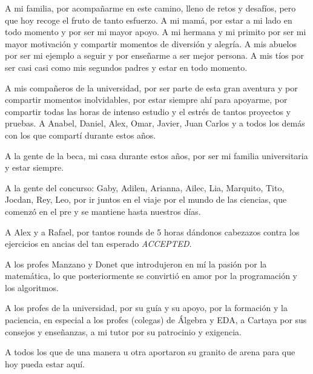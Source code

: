 \begin{acknowledgements}
    A mi familia, por acompañarme en este camino, lleno de retos y desafíos, pero que hoy recoge el fruto de tanto esfuerzo.
    A mi mamá, por estar a mi lado en todo momento y por ser mi mayor apoyo. A mi hermana y mi primito por ser mi mayor motivación y compartir
    momentos de diversión y alegría. A mis abuelos por ser mi ejemplo a seguir y por enseñarme a ser mejor persona.
    A mis tíos por ser casi casi como mis segundos padres y estar en todo momento.
    
    A mis compañeros de la universidad, por ser parte de esta gran aventura y por compartir momentos inolvidables, por 
    estar siempre ahí para apoyarme, por compartir todas las horas de intenso estudio y el estrés de tantos proyectos y pruebas.
    A Anabel, Daniel, Alex, Omar, Javier, Juan Carlos y a todos los demás con los que compartí durante estos años.
    
    A la gente de la beca, mi casa durante estos años, por ser mi familia universitaria y estar siempre.
    
    A la gente del concurso: Gaby, Adilen, Arianna, Ailec, Lia, Marquito, Tito, Jocdan, Rey, Leo,  por ir juntos en el viaje por el mundo de las ciencias, que comenzó en el pre y 
    se mantiene hasta nuestros días. 
    
    A Alex y a Rafael, por tantos rounds de 5 horas dándonos cabezazos contra los ejercicios en ancias del tan esperado 
    \textit{ACCEPTED}.
    
    A los profes Manzano y Donet que introdujeron en mí la pasión por la matemática, lo que posteriormente se convirtió
    en amor por la programación y los algoritmos.
    
    A los profes de la universidad, por su guía y su apoyo, por la formación y la paciencia, en especial a los profes (colegas) de Álgebra y EDA,
    a Cartaya por sus consejos y enseñanzas, a mi tutor por su patrocinio y exigencia.
    
    A todos los que de una manera u otra aportaron su granito de arena para que hoy pueda estar aquí.
\end{acknowledgements}